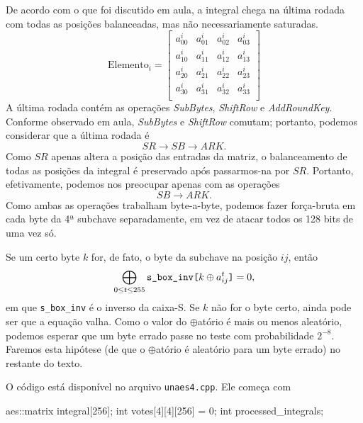 \documentclass{article}
\newcommand{\xor}{\oplus}
\begin{document}
De acordo com o que foi discutido em aula,
a integral chega na última rodada com todas as posições balanceadas,
mas não necessariamente saturadas.
\begin{equation*}
    \text{Elemento}_i =
    \begin{bmatrix}
        a^i_{00} & a^i_{01} & a^i_{02} & a^i_{03} \\
        a^i_{10} & a^i_{11} & a^i_{12} & a^i_{13} \\
        a^i_{20} & a^i_{21} & a^i_{22} & a^i_{23} \\
        a^i_{30} & a^i_{31} & a^i_{32} & a^i_{33} \\
    \end{bmatrix}
\end{equation*}
A última rodada contém as operações \emph{SubBytes},
\emph{ShiftRow} e \emph{AddRoundKey}.
Conforme observado em aula, \emph{SubBytes} e \emph{ShiftRow} comutam;
portanto, podemos considerar que a última rodada é
\begin{equation*}
    SR \to SB \to ARK.
\end{equation*}
Como $SR$ apenas altera a posição das entradas da matriz,
o balanceamento de todas as posições da integral é preservado
após passarmos-na por $SR$.
Portanto, efetivamente,
podemos nos preocupar apenas com as operações
\begin{equation*}
    SB \to ARK.
\end{equation*}
Como ambas as operações trabalham byte-a-byte,
podemos fazer força-bruta em cada byte da 4ª subchave separadamente,
em vez de atacar todos os 128 bits de uma vez só.

Se um certo byte $k$ for, de fato,
o byte da subchave na posição $ij$,
então
\begin{equation}
    \label{balanceamento}
    \bigoplus_{0 \leq t \leq 255} \verb"s_box_inv["k \xor a^t_{ij}\verb"]" = 0,
\end{equation}
em que \verb"s_box_inv" é o inverso da caixa-S.
Se $k$ não for o byte certo, ainda pode ser que a equação valha.
Como o valor do $\xor$atório é mais ou menos aleatório,
podemos esperar que um byte errado passe no teste
com probabilidade $2^{-8}$.
Faremos esta hipótese
(de que o $\xor$atório é aleatório para um byte errado)
no restante do texto.

O código está disponível no arquivo \verb"unaes4.cpp".
Ele começa com
\begin{cppcode}
    aes::matrix integral[256];
    int votes[4][4][256] = {0};
    int processed_integrals;
\end{cppcode}
\end{document}
